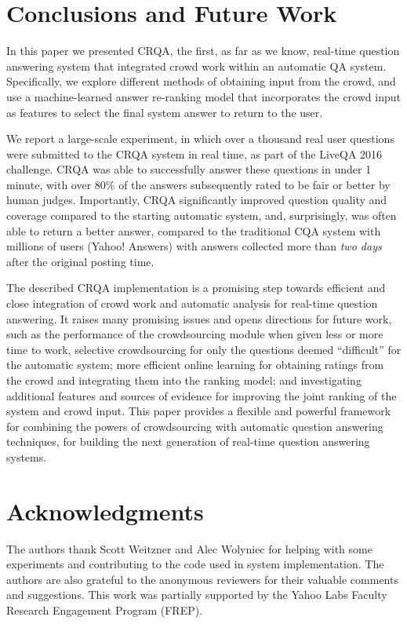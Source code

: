 \documentclass[letterpaper]{article}
\begin{document}
\section{Conclusions and Future Work} 
In this paper we presented CRQA, the first, as far as we know, real-time question answering system that integrated crowd work within an automatic QA system.
Specifically, we explore different methods of obtaining input from the crowd, and use a machine-learned answer re-ranking model that incorporates the crowd input as features to select the final system answer to return to the user. 

We report a large-scale experiment, in which over a thousand real user questions were submitted to the CRQA system in real time, as part of the LiveQA 2016 challenge.
CRQA was able to successfully answer these questions in under 1 minute, with over 80\% of the answers subsequently rated to be fair or better by human judges.
Importantly, CRQA significantly improved question quality and coverage compared to the starting automatic system, and, surprisingly, was often able to return a better answer, compared to the traditional CQA system with millions of users (Yahoo! Answers) with answers collected more than \textit{two days} after the original posting time.

The described CRQA implementation is a promising step towards efficient and close integration of crowd work and automatic analysis for real-time question answering.
It raises many promising issues and opens directions for future work, such as the performance of the crowdsourcing module when given less or more time to work, selective crowdsourcing for only the questions deemed ``difficult'' for the automatic system; more efficient online learning for obtaining ratings from the crowd and integrating them into the ranking model; and investigating additional features and sources of evidence for improving the joint ranking of the system and crowd input.
This paper provides a flexible and powerful framework for combining the powers of crowdsourcing with automatic question answering techniques, for building the next generation of real-time question answering systems.


\section{Acknowledgments}
The authors thank Scott Weitzner and Alec Wolyniec for helping with some experiments and contributing to the code used in system implementation.
The authors are also grateful to the anonymous reviewers for their valuable comments and suggestions.
This work was partially supported by the Yahoo Labs Faculty Research Engagement Program (FREP).

\bigskip
\bigskip



\end{document}
